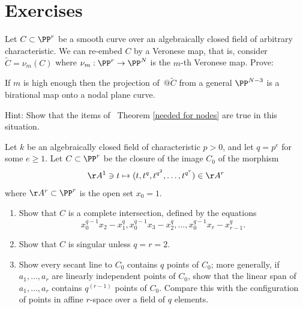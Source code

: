 \section{Exercises}

\begin{exercise}
Let $C\subset \PP^r$ be a smooth curve 
over an algebraically closed field of arbitrary characteristic. 
We can
re-embed $C$ by a
Veronese map,
that is, consider $\widetilde C = \nu_m(C)$ where
$\nu_m :
\PP^r \to \PP^N$ is the $m$-th Veronese map. Prove:

\begin{proposition}
\label{positive characteristic nodes}
If $m$ is high enough then
the projection of~$@\widetilde C$ from a general $\PP^{N-3}$
is a birational map onto a nodal
plane curve.
\unif
\end{proposition}

Hint: Show that the items of~
Theorem
\ref{needed for nodes}  are true in this
situation.
\end{exercise}


\begin{npt}
\begin{exercise}
\label{strange curves} Let $k$ be an
%
algebraically closed field of characteristic $p>0$, and let $q=p^e$
for some $e\geq 1$. Let $C\subset \PP^r$
be the closure of the image $C_0$ of the morphism
$$
\AA^1 \ni t \mapsto (t, t^q, t^{q^2}, \dots , t^{q^{r}}) \in \AA^r
$$
where $\AA^r\subset \PP^r$ is the open set $x_0=1$.
\begin{enumerate}
\item Show that $C$ is a complete intersection, defined by the equations
$$
x_0^{q-1}x_2 - x_1^q, x_0^{q-1}x_3 - x_2^q,\dots,
x_0^{q-1}x_r - x_{r-1}^q.
$$
\item Show that $C$ is singular unless $q = r = 2$.
\item Show every secant line to $C_0$ contains $q$ points of $C_0$;
more generally, if
$a_1, \dots, a_r$ are linearly independent points of $C_0$, show that
the linear span of
$a_1, \dots, a_r$ contains $q^{(r-1)}$ points of $C_0$.  Compare this
with the configuration of
points in affine $r$-space over a field of $q$ elements.
\end{enumerate}
\end{exercise}
\end{npt}

